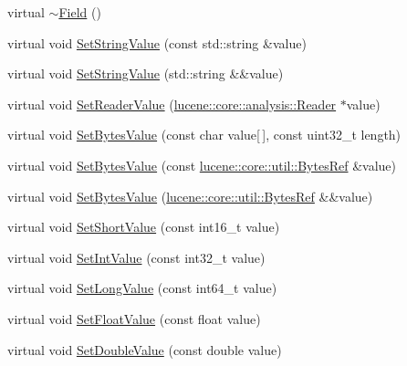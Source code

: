 \begin{DoxyCompactItemize}
\item 
virtual \mbox{\hyperlink{classlucene_1_1core_1_1document_1_1Field_aafea12de720890e69c15dbd033331391}{$\sim$\+Field}} ()
\item 
virtual void \mbox{\hyperlink{classlucene_1_1core_1_1document_1_1Field_aa649cff34208abbbe274c5112d60712d}{Set\+String\+Value}} (const std\+::string \&value)
\item 
virtual void \mbox{\hyperlink{classlucene_1_1core_1_1document_1_1Field_af2b792611d8666daf647adac0ed1a0ed}{Set\+String\+Value}} (std\+::string \&\&value)
\item 
virtual void \mbox{\hyperlink{classlucene_1_1core_1_1document_1_1Field_a86a255eb3b09b70fe76af3b7d75364e5}{Set\+Reader\+Value}} (\mbox{\hyperlink{classlucene_1_1core_1_1analysis_1_1Reader}{lucene\+::core\+::analysis\+::\+Reader}} $\ast$value)
\item 
virtual void \mbox{\hyperlink{classlucene_1_1core_1_1document_1_1Field_ab9214d49b8e3c8692820ad4f3086e6dc}{Set\+Bytes\+Value}} (const char value\mbox{[}$\,$\mbox{]}, const uint32\+\_\+t length)
\item 
virtual void \mbox{\hyperlink{classlucene_1_1core_1_1document_1_1Field_a41d077e63ce6fae8677b8df6b29821bd}{Set\+Bytes\+Value}} (const \mbox{\hyperlink{classlucene_1_1core_1_1util_1_1BytesRef}{lucene\+::core\+::util\+::\+Bytes\+Ref}} \&value)
\item 
virtual void \mbox{\hyperlink{classlucene_1_1core_1_1document_1_1Field_af61fb82abf8a917ccd5c9f252dcfa447}{Set\+Bytes\+Value}} (\mbox{\hyperlink{classlucene_1_1core_1_1util_1_1BytesRef}{lucene\+::core\+::util\+::\+Bytes\+Ref}} \&\&value)
\item 
virtual void \mbox{\hyperlink{classlucene_1_1core_1_1document_1_1Field_a1f513eaae4357667bcdbacb211fa3bff}{Set\+Short\+Value}} (const int16\+\_\+t value)
\item 
virtual void \mbox{\hyperlink{classlucene_1_1core_1_1document_1_1Field_a6aee080f0bf507f8c6a5cfc64bd913a2}{Set\+Int\+Value}} (const int32\+\_\+t value)
\item 
virtual void \mbox{\hyperlink{classlucene_1_1core_1_1document_1_1Field_a949822599f392fb7fca20423902e535a}{Set\+Long\+Value}} (const int64\+\_\+t value)
\item 
virtual void \mbox{\hyperlink{classlucene_1_1core_1_1document_1_1Field_aa22291dffcf6a545fd6c24f23fbb8b50}{Set\+Float\+Value}} (const float value)
\item 
virtual void \mbox{\hyperlink{classlucene_1_1core_1_1document_1_1Field_a8db791d4d1ebf77288d8529214413810}{Set\+Double\+Value}} (const double value)

\end{DoxyCompactItemize}
